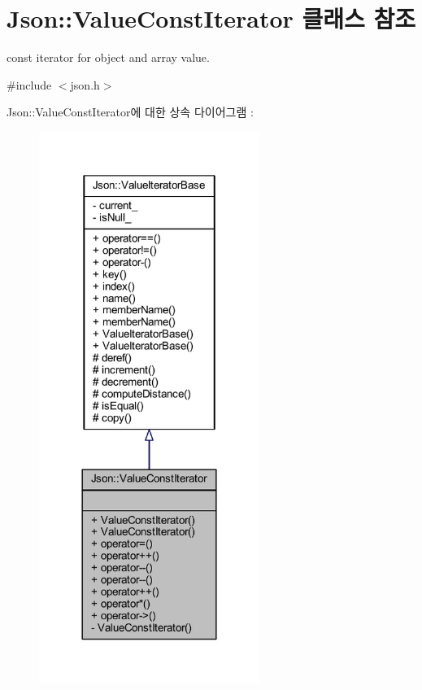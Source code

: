 \hypertarget{class_json_1_1_value_const_iterator}{}\section{Json\+:\+:Value\+Const\+Iterator 클래스 참조}
\label{class_json_1_1_value_const_iterator}


const iterator for object and array value.  




{\ttfamily \#include $<$json.\+h$>$}



Json\+:\+:Value\+Const\+Iterator에 대한 상속 다이어그램 \+: \nopagebreak
\begin{figure}[H]
\begin{center}
\leavevmode
\includegraphics[width=203pt]{class_json_1_1_value_const_iterator__inherit__graph}
\end{center}
\end{figure}


